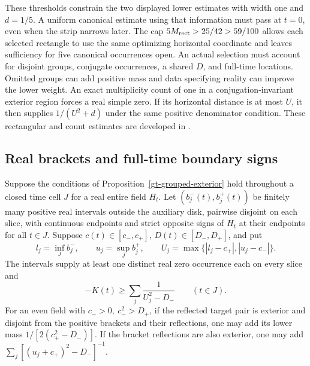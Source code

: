 These thresholds constrain the two displayed lower estimates with
width one and \(d=1/5\). A uniform canonical estimate using that
information must pass at \(t=0\), even when the strip narrows later.
The cap \(5M_{\rm rect}>25/42>59/100\) allows each selected rectangle
to use the same optimizing horizontal coordinate and leaves
sufficiency for five canonical occurrences open. An actual selection
must account for disjoint groups, conjugate occurrences, a shared
\(D\), and full-time locations. Omitted groups can add positive mass
and data specifying reality can improve the lower weight. An exact
multiplicity count of one in a conjugation-invariant exterior region
forces a real simple zero. If its horizontal distance is at most
\(U\), it then supplies \(1/(U^2+d)\) under the same positive
denominator condition.
These rectangular and count estimates are developed in \cite{gtsharpmass}.

\subsection{Real brackets and full-time boundary signs}

\begin{proposition}
\label{gt-real-brackets}
Suppose the conditions of Proposition~\ref{gt-grouped-exterior} hold
throughout a closed time cell \(J\) for a real entire field \(H_t\).
Let \((b_j^-(t),b_j^+(t))\) be finitely many positive real intervals
outside the auxiliary disk, pairwise disjoint on each slice, with
continuous endpoints and strict opposite signs of \(H_t\) at their
endpoints for all \(t\in J\). Suppose \(c(t)\in[c_-,c_+]\),
\(D(t)\in[D_-,D_+]\), and put
\[
 l_j=\inf_J b_j^-,\qquad u_j=\sup_J b_j^+,\qquad
 U_j=\max\{|l_j-c_+|,|u_j-c_-|\}.
\]
The intervals supply at least one distinct real zero occurrence each
on every slice and
\begin{equation}
 -K(t)\ge\sum_j\frac{1}{U_j^2-D_-}\qquad(t\in J).
 \label{gt-real-bracket-mass}
\end{equation}
For an even field with \(c_->0,\ c_-^2>D_+\), if the reflected target
pair is exterior and disjoint from the positive brackets and their
reflections, one may add its lower mass \(1/[2(c_+^2-D_-)]\).
If the bracket reflections are also exterior, one may add
\(\sum_j[(u_j+c_+)^2-D_-]^{-1}\).
\end{proposition}


